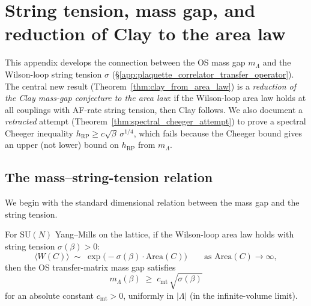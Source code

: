 \section{String tension, mass gap, and reduction of Clay to the
area law}
\label{app:spectral_cheeger_string_tension}

This appendix develops the connection between the OS mass gap
$m_{\Lambda}$ and the Wilson-loop string tension $\sigma$
(\S\ref{app:plaquette_correlator_transfer_operator}). The central
new result (Theorem~\ref{thm:clay_from_area_law}) is a
\emph{reduction of the Clay mass-gap conjecture to the area law}:
if the Wilson-loop area law holds at all couplings with AF-rate
string tension, then Clay follows. We also document a
\emph{retracted} attempt (Theorem~\ref{thm:spectral_cheeger_attempt})
to prove a spectral Cheeger inequality
$h_{\mathrm{RP}}\ge c\sqrt{\beta}\,\sigma^{1/4}$, which fails
because the Cheeger bound gives an upper (not lower) bound on
$h_{\mathrm{RP}}$ from $m_{\Lambda}$.

\subsection{The mass--string-tension relation}
\label{ssec:mass_tension}

We begin with the standard dimensional relation between the mass gap
and the string tension.

\begin{lemma}
\label{lem:mass_tension}
For $\mathrm{SU}(N)$ Yang--Mills on the lattice, if the Wilson-loop
area law holds with string tension $\sigma(\beta)>0$:
\begin{equation}
\label{eq:area_law}
  \langle W(C)\rangle\;\sim\;\exp\!\bigl(-\sigma(\beta)\cdot\mathrm{Area}(C)\bigr)
  \qquad\text{as }\mathrm{Area}(C)\to\infty,
\end{equation}
then the OS transfer-matrix mass gap satisfies
\begin{equation}
\label{eq:mass_tension}
  m_{\Lambda}(\beta)\;\ge\;c_{\mathrm{mt}}\,\sqrt{\sigma(\beta)}
\end{equation}
for an absolute constant $c_{\mathrm{mt}}>0$, uniformly in
$|\Lambda|$ (in the infinite-volume limit).
\end{lemma}

